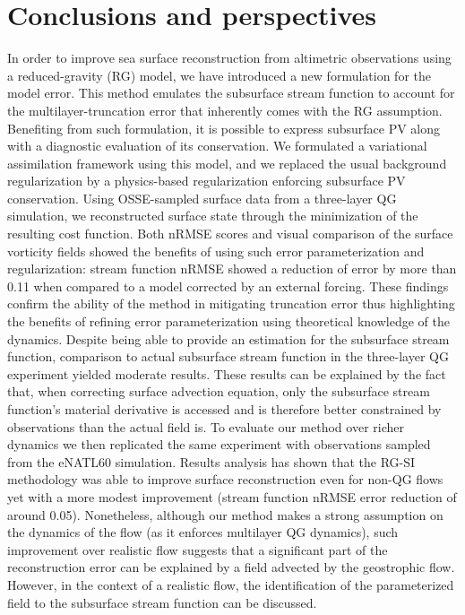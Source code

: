 \documentclass[
  draft
]{agujournal2025}
\begin{document}
\section{Conclusions and perspectives}\label{sec:conclusions}

In order to improve sea surface reconstruction from altimetric observations using a reduced-gravity (RG) model, we have introduced a new formulation for the model error. This method emulates the subsurface stream function to account for the multilayer-truncation error that inherently comes with the RG assumption. Benefiting from such formulation, it is possible to express subsurface PV along with a diagnostic evaluation of its conservation.
We formulated a variational assimilation framework using this model, and we replaced the usual background regularization by a physics-based regularization enforcing subsurface PV conservation. Using OSSE-sampled surface data from a three-layer QG simulation, we reconstructed surface state through the minimization of the resulting cost function. Both nRMSE scores and visual comparison of the surface vorticity fields showed the benefits of using such error parameterization and regularization: stream function nRMSE showed a reduction of error by more than 0.11 when compared to a model corrected by an external forcing. These findings confirm the ability of the method in mitigating truncation error thus highlighting the benefits of refining error parameterization using theoretical knowledge of the dynamics.
Despite being able to provide an estimation for the subsurface stream function, comparison to actual subsurface stream function in the three-layer QG experiment yielded moderate results. These results can be explained by the fact that, when correcting surface advection equation, only the subsurface stream function's material derivative is accessed and is therefore better constrained by observations than the actual field is.
To evaluate our method over richer dynamics we then replicated the same experiment with observations sampled from the eNATL60 simulation. Results analysis has shown that the RG-SI methodology was able to improve surface reconstruction even for non-QG flows yet with a more modest improvement (stream function nRMSE error reduction of around 0.05). Nonetheless, although our method makes a strong assumption on the dynamics of the flow (as it enforces multilayer QG dynamics), such improvement over realistic flow suggests that a significant part of the reconstruction error can be explained by a field advected by the geostrophic flow. However, in the context of a realistic flow, the identification of the parameterized field to the subsurface stream function can be discussed.
 
\end{document}
